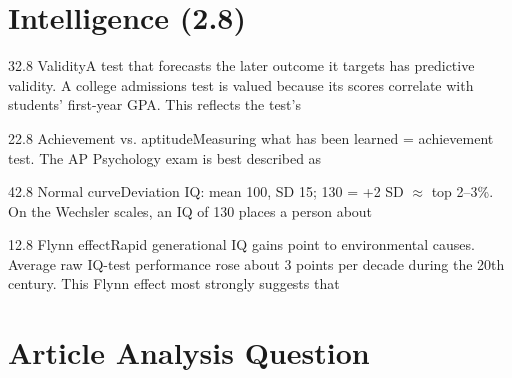 \documentclass[11pt]{article}
\begin{document}
\section{Intelligence (2.8)}

\begin{q}{3}{2.8 Validity}{A test that forecasts the later outcome it targets has predictive validity.}
A college admissions test is valued because its scores correlate with students' first-year GPA. This reflects the test's
\end{q}

\begin{q}{2}{2.8 Achievement vs. aptitude}{Measuring what has been learned = achievement test.}
The AP Psychology exam is best described as
\end{q}

\begin{q}{4}{2.8 Normal curve}{Deviation IQ: mean 100, SD 15; 130 = +2 SD \(\approx\) top 2--3\%.}
On the Wechsler scales, an IQ of 130 places a person about
\end{q}

\begin{q}{1}{2.8 Flynn effect}{Rapid generational IQ gains point to environmental causes.}
Average raw IQ-test performance rose about 3 points per decade during the 20th century. This Flynn effect most strongly suggests that
\end{q}

\section{Article Analysis Question}
\end{document}
